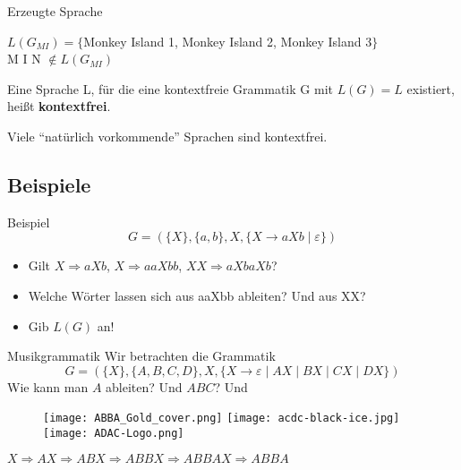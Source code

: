 \begin{frame}{Erzeugte Sprache}
	\begin{Beispiel}
		$L(G_{MI}) = \{$Monkey Island 1, Monkey Island 2, Monkey Island 3$\}$\\
		M I N $\notin L(G_{MI})$
	\end{Beispiel}
	
	\pause
	\begin{Definition}
		Eine Sprache L, für die eine kontextfreie Grammatik G mit $L(G) = L$ existiert, heißt \textbf{kontextfrei}.
	\end{Definition}

	Viele \enquote{natürlich vorkommende} Sprachen sind kontextfrei.
		
\end{frame}

\subsection{Beispiele}
\begin{frame}{Beispiel}
	$$ G = (\{X\}, \{a, b\}, X, \{X \to aXb \mid \varepsilon\}) $$
	
	\begin{itemize}
		\item Gilt $X \Rightarrow aXb$, $X \Rightarrow aaXbb$, $XX \Rightarrow aXbaXb$?
		\item Welche Wörter lassen sich aus aaXbb ableiten? Und aus XX?
		\item Gib $L(G)$ an!
	\end{itemize}
	
\end{frame}

\begin{frame}{Musikgrammatik}
	Wir betrachten die Grammatik $$G = (\{X\}, \{A, B, C, D\}, X, \{X \to \varepsilon \mid AX \mid BX \mid CX \mid DX\})$$
		Wie kann man $A$ ableiten? Und $ABC$? \pause Und
		\begin{figure}[h!]
			\centering
			\texttt{[image: ABBA\_Gold\_cover.png]} \hspace{2em} \pause
			\texttt{[image: acdc-black-ice.jpg]} \hspace{2em} \pause
			\texttt{[image: ADAC-Logo.png]} \pause
		\end{figure} 
	
		$X \Rightarrow AX \Rightarrow ABX \Rightarrow ABBX \Rightarrow ABBAX \Rightarrow ABBA$
		
\end{frame}


